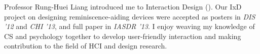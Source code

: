 \noindent
Professor Rung-Huei Liang introduced me to Interaction Design ().
Our IxD project on designing reminiscence-aiding devices were accepted as posters in \textit{DIS '12} and \textit{CHI '13}, 
and full paper in \textit{IASDR '13}.
I enjoy weaving my knowledge of CS and psychology together to develop user-friendly interaction 
and making contribution to the field of HCI and design research.\\

%

